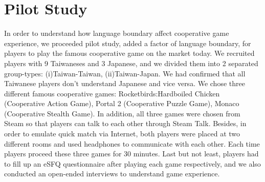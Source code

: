 \section{Pilot Study}


In order to understand how language boundary affect cooperative game experience, we proceeded pilot study, added a factor of language boundary, for players to play the famous cooperative game on the market today. We recruited players with 9 Taiwaneses and 3 Japanese, and we divided them into 2 separated group-types: (i)Taiwan-Taiwan, (ii)Taiwan-Japan. We had confirmed that all Taiwanese players don't understand Japanese and vice versa. We chose three different famous cooperative games: Rocketbirds:Hardboiled Chicken (Cooperative Action Game), Portal 2 (Cooperative Puzzle Game), Monaco (Cooperative Stealth Game). In addition, all three games were chosen from Steam\cite{PS1} so that players can talk to each other through Steam Talk. Besides, in order to emulate quick match via Internet, both players were placed at two different rooms and used headphones to communicate with each other. Each time players proceed these three games for 30 minutes. Last but not least, players had to fill up an eSFQ\cite{eSFQ} questionnaire after playing each game respectively, and we also conducted an open-ended interviews to understand game experience. 

